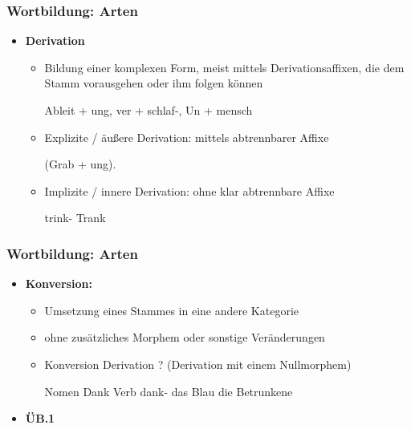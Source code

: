 \begin{frame}
\frametitle{Wortbildung: Arten}

\begin{itemize}
\item \textbf{Derivation}

\begin{itemize}
\item Bildung einer komplexen Form, meist mittels Derivationsaffixen, die dem Stamm vorausgehen oder ihm folgen können

\ea Ableit + ung, ver + schlaf-, Un + mensch
\z

\item Explizite / äußere Derivation: mittels abtrennbarer Affixe

\ea (Grab + ung).
\z

\item Implizite / innere Derivation: ohne klar abtrennbare Affixe

\ea trink- \vs Trank
\z

\end{itemize}
\end{itemize}

\end{frame}

\begin{frame}
\frametitle{Wortbildung: Arten}

\begin{itemize}
\item \textbf{Konversion:}

\begin{itemize}
\item Umsetzung eines Stammes in eine andere Kategorie
\item ohne zusätzliches Morphem oder sonstige Veränderungen
\item Konversion \ras Derivation ? (Derivation mit einem Nullmorphem)

\eal 
\ex Nomen Dank \vs Verb dank-
\ex das Blau
\ex die Betrunkene
\zl

\end{itemize}

\item[] \textbf{ÜB.1}
\end{itemize}


\end{frame}


%
%
%
%
%


